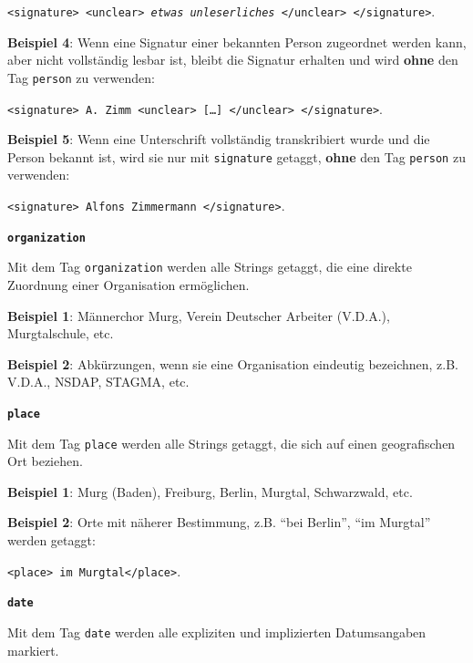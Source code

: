 \documentclass[12pt, a4paper, ngerman, bidi=default]{article}
\newcommand{\code}[1]{\colorbox{VeryLightGray}{\texttt{#1}}} %
\begin{document}
\begin{description}
    \code{<signature>~<unclear>~\textit{etwas unleserliches}~</unclear>~</signature>}.
    
    \textbf{ Beispiel 4}: Wenn eine Signatur einer bekannten Person zugeordnet werden kann, aber nicht vollständig lesbar ist, bleibt die Signatur erhalten und wird \textbf{ohne} den Tag \texttt{\colorbox{person}{person}} zu verwenden: 

    \code{<signature>~A. Zimm~<unclear>~[\ldots]~</unclear>~</signature>}.
    
    \textbf{ Beispiel 5}: Wenn eine Unterschrift vollständig transkribiert wurde und die Person bekannt ist, wird sie nur mit \texttt{\colorbox{signature}{signature}} getaggt, \textbf{ohne} den Tag \texttt{\colorbox{person}{person}} zu verwenden:  

    \code{<signature>~Alfons Zimmermann~</signature>}.
    
    \item\texttt{\textbf{{\colorbox{organization}{organization}}}}
        
    Mit dem Tag \texttt{\colorbox{organization}{organization}} werden alle Strings getaggt, die eine direkte Zuordnung einer Organisation ermöglichen.  
    
    \noindent \textbf{ Beispiel 1}: Männerchor Murg, Verein Deutscher Arbeiter (V.D.A.), Murgtalschule, etc.

    \textbf{ Beispiel 2}: Abkürzungen, wenn sie eine Organisation eindeutig bezeichnen, z.B. V.D.A., NSDAP, STAGMA, etc.
    

    \item\texttt{\textbf{{\colorbox{place}{place}}}}
        
    Mit dem Tag \texttt{\colorbox{place}{place}} werden alle Strings getaggt, die sich auf einen geografischen Ort beziehen.  
    
    \noindent \textbf{ Beispiel 1}: Murg (Baden), Freiburg, Berlin, Murgtal, Schwarzwald, etc.

    \textbf{ Beispiel 2}: Orte mit näherer Bestimmung, z.B. \enquote{bei Berlin}, \enquote{im Murgtal} werden getaggt:  

    \code{<place>~im Murgtal</place>}.

    
    \item\texttt{\textbf{{\colorbox{date}{date}}}}
        
    Mit dem Tag \texttt{\colorbox{date}{date}} werden alle expliziten und implizierten Datumsangaben markiert.  
    

\end{description}
\end{document}
